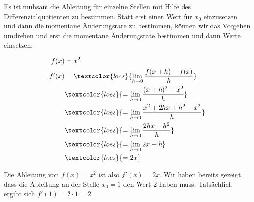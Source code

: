 Es ist mühsam die Ableitung für einzelne Stellen mit Hilfe des Differenzialquotienten zu bestimmen. Statt erst einen Wert für \(x_0\) einzusetzen und dann die momentane Änderungsrate zu bestimmen, können wir das Vorgehen umdrehen und erst die momentane Änderungsrate bestimmen und dann Werte einsetzen:\\
\begin{minipage}[t]{\textwidth}
	\begin{minipage}{0.4\textwidth}
		\begin{align*}
			f(x)&=x^2\\
			f'(x)&=\textcolor{loes}{\lim\limits_{h\to 0}\frac{f(x+h)-f(x)}{h}}\\
			&\textcolor{loes}{=\lim\limits_{h\to 0}\frac{(x+h)^2-x^2}{h}}\\
			&\textcolor{loes}{=\lim\limits_{h\to 0}\frac{x^2+2hx+h^2-x^2}{h}}\\
			&\textcolor{loes}{=\lim\limits_{h\to 0}\frac{2hx+h^2}{h}}\\
			&\textcolor{loes}{=\lim\limits_{h\to 0}2x+h}\\
			&\textcolor{loes}{=2x}\\
		\end{align*}
	\end{minipage}
	\begin{minipage}{0.6\textwidth}
		\textcolor{loes}{Die Ableitung von \(f(x)=x^2\) ist also \(f'(x)=2x\). Wir haben bereits gezeigt, dass die Ableitung an der Stelle \(x_0=1\) den Wert 2 haben muss. Tatsächlich ergibt sich \(f'(1)=2\cdot 1=2\).}
	\end{minipage}
\end{minipage}\\
\vspace{5cm}\\
